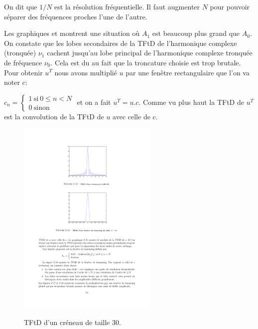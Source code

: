 On dit que $1/N$ est la r\'{e}solution fr\'{e}quentielle. Il faut augmenter $N$ pour pouvoir s\'{e}parer des fr\'{e}quences proches l'une de l'autre.


Les graphiques  et  montrent une situation o\`{u} $A_{1}$ est beaucoup plus grand que $A_{0}$. On constate que les lobes secondaires de la TFtD de l'harmonique complexe (tronqu\'{e}e) $\nu_{1}$ cachent jusqu'au lobe principal de l'harmonique complexe tronqu\'{e}e de fr\'{e}quence $\nu_{0}$. Cela est du au fait que la troncature choisie est trop brutale. Pour obtenir $u^{T}$ nous avons multipli\'{e} $u$ par une fen\^{e}tre rectangulaire que l'on va noter $c$:

$c_{n}=\left\{\begin{array}{l}
1\ \mathrm{s}\mathrm{i}\ 0\leq n<N\\
0\ \mathrm{s}\mathrm{i}\mathrm{n}\mathrm{o}\mathrm{n}
\end{array}\right.$
et on a fait $u^{T}=u.c$. Comme vu plus haut la TFtD de $u^{T}$ est la convolution de la
TFtD de $u$ avec celle de $c$.
\begin{figure}
  \centering
  \includegraphics[width=0.6\textwidth]{Figures/Figure2-15}\\
  \caption{TFtD d'un cr\'{e}neau de taille 30.}\label{fig:figure2-15}
\end{figure}

